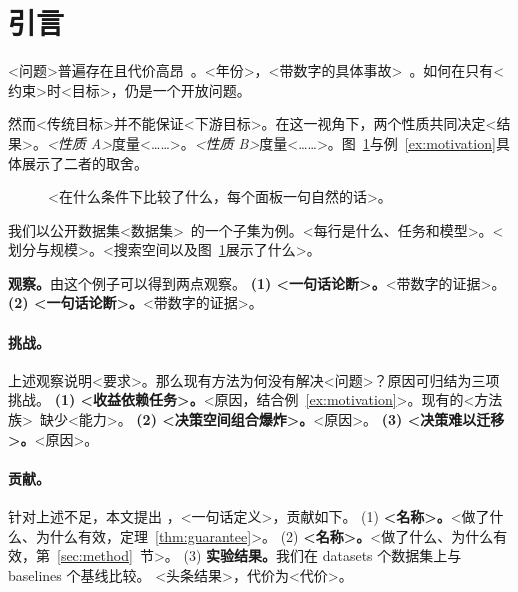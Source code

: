 \section{引言}
\label{sec:intro}

<问题>普遍存在且代价高昂~\cite{placeholder2024}。<年份>，<带数字的具体事故>~\cite{placeholder2024}。如何在只有<约束>时<目标>，仍是一个开放问题。

然而<传统目标>并不能保证<下游目标>。在这一视角下，两个性质共同决定<结果>。\emph{<性质 A>}度量<……>。\emph{<性质 B>}度量<……>。图~\ref{fig:motivation}与例~\ref{ex:motivation}具体展示了二者的取舍。

\begin{figure}[t]
\centering
{}
\caption{<在什么条件下比较了什么，每个面板一句自然的话>。}
\label{fig:motivation}
\end{figure}

\begin{example}[<短标题>]
\label{ex:motivation}
我们以公开数据集<数据集>~\cite{placeholder2024}的一个子集为例。<每行是什么、任务和模型>。<划分与规模>。<搜索空间以及图~\ref{fig:motivation}展示了什么>。
\end{example}

\textbf{观察。}由这个例子可以得到两点观察。
\textbf{(1) <一句话论断>。}<带数字的证据>。
\textbf{(2) <一句话论断>。}<带数字的证据>。

\paragraph{挑战。}上述观察说明<要求>。那么现有方法为何没有解决<问题>？原因可归结为三项挑战。
\textbf{(1) <收益依赖任务>。}<原因，结合例~\ref{ex:motivation}>。现有的<方法族>~\cite{placeholder2024}缺少<能力>。
\textbf{(2) <决策空间组合爆炸>。}<原因>。
\textbf{(3) <决策难以迁移>。}<原因>。

\paragraph{贡献。}针对上述不足，本文提出 \sys{}，<一句话定义>，贡献如下。
(1) \textbf{<名称>。}<做了什么、为什么有效，定理~\ref{thm:guarantee}>。
(2) \textbf{<名称>。}<做了什么、为什么有效，第~\ref{sec:method}~节>。
(3) \textbf{实验结果。}我们在 \num{datasets} 个数据集上与 \num{baselines} 个基线比较。\sys{} <头条结果>，代价为<代价>。
